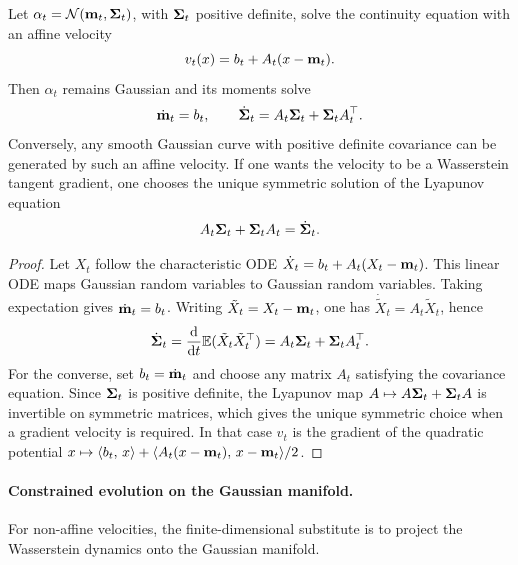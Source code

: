\begin{prop}\label{prop-gaussian-affine-closure}
	Let $\alpha_t=\mathcal{N}(\mathbf{m}_t,\mathbf{\Sigma}_t)$, with $\mathbf{\Sigma}_t$ positive definite, solve the continuity equation with an affine velocity
	\[
		v_t(x)=b_t+A_t(x-\mathbf{m}_t).
	\]
	Then $\alpha_t$ remains Gaussian and its moments solve
	\[
		\dot {\mathbf{m}}_t=b_t,
		\qquad
		\dot{\mathbf{\Sigma}}_t=A_t\mathbf{\Sigma}_t+\mathbf{\Sigma}_t A_t^\top .
	\]
	Conversely, any smooth Gaussian curve with positive definite covariance can be generated by such an affine velocity. If one wants the velocity to be a Wasserstein tangent gradient, one chooses the unique symmetric solution of the Lyapunov equation
	\[
		A_t\mathbf{\Sigma}_t+\mathbf{\Sigma}_t A_t=\dot{\mathbf{\Sigma}}_t.
	\]
\end{prop}

\begin{proof}
	Let $X_t$ follow the characteristic ODE $\dot X_t=b_t+A_t(X_t-\mathbf{m}_t)$. This linear ODE maps Gaussian random variables to Gaussian random variables. Taking expectation gives $\dot{\mathbf{m}}_t=b_t$. Writing $\tilde X_t=X_t-\mathbf{m}_t$, one has $\dot{\tilde X}_t=A_t\tilde X_t$, hence
	\[
		\dot{\mathbf{\Sigma}}_t
		=
		\frac{\mathrm{d}}{\mathrm{d} t}\mathbb{E}(\tilde X_t\tilde X_t^\top)
		=
		A_t\mathbf{\Sigma}_t+\mathbf{\Sigma}_t A_t^\top .
	\]
	For the converse, set $b_t=\dot{\mathbf{m}}_t$ and choose any matrix $A_t$ satisfying the covariance equation. Since $\mathbf{\Sigma}_t$ is positive definite, the Lyapunov map $A\mapsto A\mathbf{\Sigma}_t+\mathbf{\Sigma}_t A$ is invertible on symmetric matrices, which gives the unique symmetric choice when a gradient velocity is required. In that case $v_t$ is the gradient of the quadratic potential $x\mapsto \langle b_t,\,x\rangle+\langle A_t(x-\mathbf{m}_t),\,x-\mathbf{m}_t\rangle/2$.
\end{proof}

\paragraph{Constrained evolution on the Gaussian manifold.}

For non-affine velocities, the finite-dimensional substitute is to project the Wasserstein dynamics onto the Gaussian manifold.

